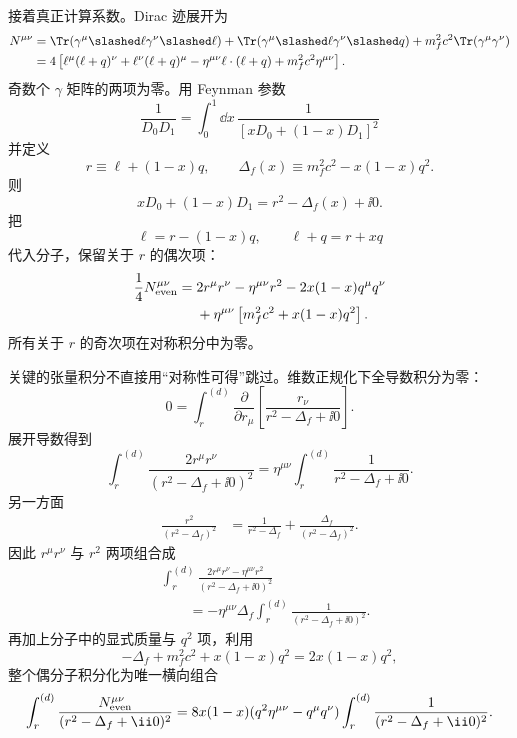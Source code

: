 \begin{derivation}
接着真正计算系数。Dirac 迹展开为
\begin{align*}
 N^{\mu\nu}
 &=\Tr(\gamma^\mu\slashed\ell\gamma^\nu\slashed\ell)
 +\Tr(\gamma^\mu\slashed\ell\gamma^\nu\slashed q)
 +m_f^2c^2\Tr(\gamma^\mu\gamma^\nu)\\
 &=4\left[
 \ell^\mu(\ell+q)^\nu
 +\ell^\nu(\ell+q)^\mu
 -\eta^{\mu\nu}\ell\cdot(\ell+q)
 +m_f^2c^2\eta^{\mu\nu}
 \right].
\end{align*}
奇数个 $\gamma$ 矩阵的两项为零。用 Feynman 参数
\begin{equation*}
 \frac1{D_0D_1}
 =\int_0^1\dd x\,
 \frac1{[xD_0+(1-x)D_1]^2}
\end{equation*}
并定义
\begin{equation*}
 r\equiv\ell+(1-x)q,
 \qquad
 \Delta_f(x)\equiv m_f^2c^2-x(1-x)q^2.
\end{equation*}
则
\begin{equation*}
 xD_0+(1-x)D_1=r^2-\Delta_f(x)+\ii0.
\end{equation*}
把
\begin{equation*}
 \ell=r-(1-x)q,
 \qquad
 \ell+q=r+xq
\end{equation*}
代入分子，保留关于 $r$ 的偶次项：
\begin{align*}
 \frac14N^{\mu\nu}_{\rm even}
 ={}&2r^\mu r^\nu-\eta^{\mu\nu}r^2
 -2x(1-x)q^\mu q^\nu\\
 &+\eta^{\mu\nu}
 \left[m_f^2c^2+x(1-x)q^2\right].
\end{align*}
所有关于 $r$ 的奇次项在对称积分中为零。

关键的张量积分不直接用“对称性可得”跳过。维数正规化下全导数积分为零：
\begin{equation*}
 0=\int_r^{(d)}
 \frac{\partial}{\partial r_\mu}
 \left[
 \frac{r_\nu}{r^2-\Delta_f+\ii0}
 \right].
\end{equation*}
展开导数得到
\begin{equation*}
 \int_r^{(d)}
 \frac{2r^\mu r^\nu}
 {(r^2-\Delta_f+\ii0)^2}
 =\eta^{\mu\nu}
 \int_r^{(d)}
 \frac1{r^2-\Delta_f+\ii0}.
\end{equation*}
另一方面
\begin{align*}
 \frac{r^2}{(r^2-\Delta_f)^2}
 &=\frac1{r^2-\Delta_f}
 +\frac{\Delta_f}{(r^2-\Delta_f)^2}.
\end{align*}
因此 $r^\mu r^\nu$ 与 $r^2$ 两项组合成
\begin{align*}
 &\int_r^{(d)}
 \frac{2r^\mu r^\nu-\eta^{\mu\nu}r^2}
 {(r^2-\Delta_f+\ii0)^2}\\
 &\qquad=-\eta^{\mu\nu}\Delta_f
 \int_r^{(d)}
 \frac1{(r^2-\Delta_f+\ii0)^2}.
\end{align*}
再加上分子中的显式质量与 $q^2$ 项，利用
\begin{equation*}
 -\Delta_f+m_f^2c^2+x(1-x)q^2
 =2x(1-x)q^2,
\end{equation*}
整个偶分子积分化为唯一横向组合
\begin{align*}
 \int_r^{(d)}\frac{N^{\mu\nu}_{\rm even}}
 {(r^2-\Delta_f+\ii0)^2}
 =8x(1-x)
 (q^2\eta^{\mu\nu}-q^\mu q^\nu)
 \int_r^{(d)}\frac1{(r^2-\Delta_f+\ii0)^2}.
\end{align*}


\end{derivation}
